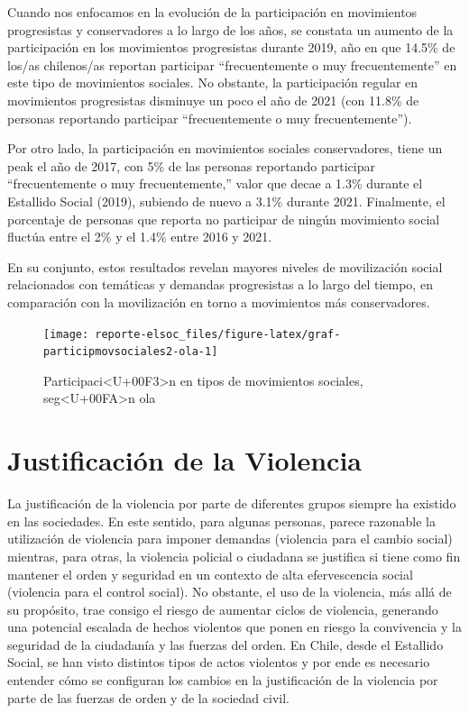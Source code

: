 \documentclass[
  12pt,
]{book}
\begin{document}
Cuando nos enfocamos en la evolución de la participación en movimientos progresistas y conservadores a lo largo de los años, se constata un aumento de la participación en los movimientos progresistas durante 2019, año en que 14.5\% de los/as chilenos/as reportan participar ``frecuentemente o muy frecuentemente'' en este tipo de movimientos sociales. No obstante, la participación regular en movimientos progresistas disminuye un poco el año de 2021 (con 11.8\% de personas reportando participar ``frecuentemente o muy frecuentemente'').

Por otro lado, la participación en movimientos sociales conservadores, tiene un peak el año de 2017, con 5\% de las personas reportando participar ``frecuentemente o muy frecuentemente,'' valor que decae a 1.3\% durante el Estallido Social (2019), subiendo de nuevo a 3.1\% durante 2021. Finalmente, el porcentaje de personas que reporta no participar de ningún movimiento social fluctúa entre el 2\% y el 1.4\% entre 2016 y 2021.

En su conjunto, estos resultados revelan mayores niveles de movilización social relacionados con temáticas y demandas progresistas a lo largo del tiempo, en comparación con la movilización en torno a movimientos más conservadores.

\begin{figure}

{\centering \texttt{[image: reporte-elsoc\_files/figure-latex/graf-participmovsociales2-ola-1]} 

}

\caption{Participaci<U+00F3>n en tipos de movimientos sociales, seg<U+00FA>n ola}\label{fig:graf-participmovsociales2-ola}
\end{figure}

\hypertarget{justificaciuxf3n-de-la-violencia}{%
\section{Justificación de la Violencia}\label{justificaciuxf3n-de-la-violencia}}

La justificación de la violencia por parte de diferentes grupos siempre ha existido en las sociedades. En este sentido, para algunas personas, parece razonable la utilización de violencia para imponer demandas (violencia para el cambio social) mientras, para otras, la violencia policial o ciudadana se justifica si tiene como fin mantener el orden y seguridad en un contexto de alta efervescencia social (violencia para el control social). No obstante, el uso de la violencia, más allá de su propósito, trae consigo el riesgo de aumentar ciclos de violencia, generando una potencial escalada de hechos violentos que ponen en riesgo la convivencia y la seguridad de la ciudadanía y las fuerzas del orden. En Chile, desde el Estallido Social, se han visto distintos tipos de actos violentos y por ende es necesario entender cómo se configuran los cambios en la justificación de la violencia por parte de las fuerzas de orden y de la sociedad civil.
\end{document}
